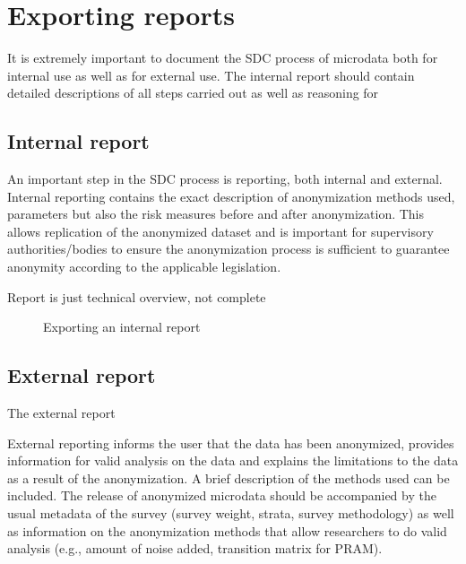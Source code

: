 \documentclass[letterpaper,10pt,english]{sphinxmanual}
\begin{document}
\section{Exporting reports}
\label{\detokenize{reproducibility:exporting-reports}}
It is extremely important to document the SDC process of microdata both for internal
use as well as for external use. The internal report should contain detailed descriptions
of all steps carried out as well as reasoning for


\subsection{Internal report}
\label{\detokenize{reproducibility:internal-report}}
An important step in the SDC process is reporting, both internal and external.
Internal reporting contains the exact description of anonymization methods used,
parameters but also the risk measures before and after anonymization. This allows
replication of the anonymized dataset and is important for supervisory authorities/bodies
to ensure the anonymization process is sufficient to guarantee anonymity according
to the applicable legislation.

Report is just technical overview, not complete

\begin{figure}[htbp]
\centering
\capstart

\noindent{}
\caption{Exporting an internal report}\label{\detokenize{reproducibility:fig112}}\label{\detokenize{reproducibility:id6}}\end{figure}


\subsection{External report}
\label{\detokenize{reproducibility:external-report}}
The external report

External reporting informs the user that the data has been anonymized,
provides information for valid analysis on the data and explains the limitations to
the data as a result of the anonymization. A brief description of the methods used
can be included. The release of anonymized microdata should be accompanied by the
usual metadata of the survey (survey weight, strata, survey methodology) as well as
information on the anonymization methods that allow researchers to do valid analysis
(e.g., amount of noise added, transition matrix for PRAM).
\end{document}
